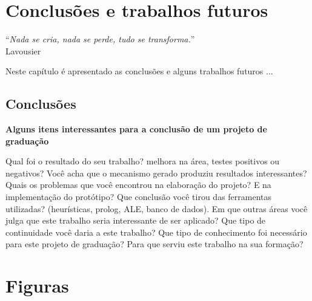 \documentclass[brazil]{abnt}
\begin{document}
\chapter{Conclusões e trabalhos futuros\label{cap:conclusao}}

\vfill{}
\begin{flushright}{}``\emph{Nada se cria, nada se perde, tudo se
transforma.}''\\
{\small Lavousier}\end{flushright}{\small \par}
\vfill{}

Neste capítulo é apresentado as conclusões e alguns trabalhos futuros
...
\newpage


\section{Conclusões}

{\bf Alguns itens interessantes para a conclusão de um projeto de graduação}

Qual foi o resultado do seu trabalho? melhora na área, testes positivos ou negativos?
Você acha que o mecanismo gerado produziu resultados interessantes?
Quais os problemas que você encontrou na elaboração do projeto?
E na implementação do protótipo?
Que conclusão você tirou das ferramentas utilizadas? (heurísticas, prolog, ALE, banco de dados).
Em que outras áreas você julga que este trabalho seria interessante de ser aplicado?
Que tipo de continuidade você daria a este trabalho?
Que tipo de conhecimento foi necessário para este projeto de graduação?
Para que serviu este trabalho na sua formação?






\anexo

\chapter{Figuras}
\end{document}
